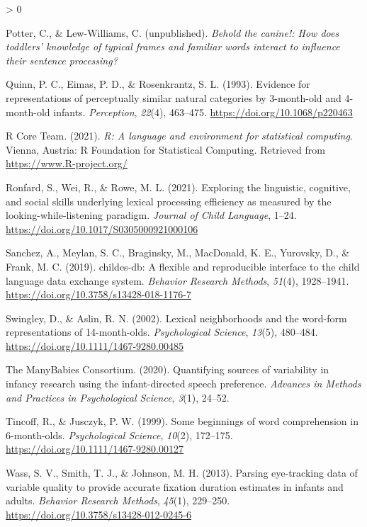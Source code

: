 \documentclass[
  english,
  man,floatsintext]{apa6}
\newlength{\cslhangindent}
\newenvironment{CSLReferences}[2] %
 {%
  \setlength{\parindent}{0pt}
  \ifodd #1 \everypar{\setlength{\hangindent}{\cslhangindent}}\ignorespaces\fi
  \ifnum #2 > 0
  \setlength{\parskip}{#2\baselineskip}
  \fi
 }%
 {}
\begin{document}
\begin{CSLReferences}{1}{0}
\leavevmode\hypertarget{ref-PotterLewWilliamsUnpub}{}%
Potter, C., \& Lew-Williams, C. (unpublished). \emph{{Behold the canine!: How does toddlers' knowledge of typical frames and familiar words interact to influence their sentence processing?}}

\leavevmode\hypertarget{ref-Quinn1993}{}%
Quinn, P. C., Eimas, P. D., \& Rosenkrantz, S. L. (1993). {Evidence for representations of perceptually similar natural categories by 3-month-old and 4-month-old infants}. \emph{Perception}, \emph{22}(4), 463--475. \url{https://doi.org/10.1068/p220463}

\leavevmode\hypertarget{ref-R-base}{}%
R Core Team. (2021). \emph{R: A language and environment for statistical computing}. Vienna, Austria: R Foundation for Statistical Computing. Retrieved from \url{https://www.R-project.org/}

\leavevmode\hypertarget{ref-Ronfard2021}{}%
Ronfard, S., Wei, R., \& Rowe, M. L. (2021). Exploring the linguistic, cognitive, and social skills underlying lexical processing efficiency as measured by the looking-while-listening paradigm. \emph{Journal of Child Language}, 1--24. \url{https://doi.org/10.1017/S0305000921000106}

\leavevmode\hypertarget{ref-Sanchez2019}{}%
Sanchez, A., Meylan, S. C., Braginsky, M., MacDonald, K. E., Yurovsky, D., \& Frank, M. C. (2019). {childes-db: A flexible and reproducible interface to the child language data exchange system}. \emph{Behavior Research Methods}, \emph{51}(4), 1928--1941. \url{https://doi.org/10.3758/s13428-018-1176-7}

\leavevmode\hypertarget{ref-Swingley2002}{}%
Swingley, D., \& Aslin, R. N. (2002). {Lexical neighborhoods and the word-form representations of 14-month-olds}. \emph{Psychological Science}, \emph{13}(5), 480--484. \url{https://doi.org/10.1111/1467-9280.00485}

\leavevmode\hypertarget{ref-manybabies2020}{}%
The ManyBabies Consortium. (2020). {Quantifying sources of variability in infancy research using the infant-directed speech preference}. \emph{Advances in Methods and Practices in Psychological Science}, \emph{3}(1), 24--52.

\leavevmode\hypertarget{ref-Tincoff1999}{}%
Tincoff, R., \& Jusczyk, P. W. (1999). {Some beginnings of word comprehension in 6-month-olds}. \emph{Psychological Science}, \emph{10}(2), 172--175. \url{https://doi.org/10.1111/1467-9280.00127}

\leavevmode\hypertarget{ref-Wass2013}{}%
Wass, S. V., Smith, T. J., \& Johnson, M. H. (2013). {Parsing eye-tracking data of variable quality to provide accurate fixation duration estimates in infants and adults.} \emph{Behavior Research Methods}, \emph{45}(1), 229--250. \url{https://doi.org/10.3758/s13428-012-0245-6}


\end{CSLReferences}
\end{document}
